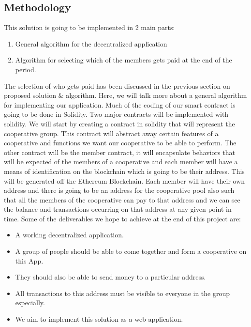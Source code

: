 \documentclass{article}
\begin{document}
\begin{flushleft}
\section{Methodology}
This solution is going to be implemented in 2 main parts:
\begin{enumerate}
    \item General algorithm for the decentralized application
    \item Algorithm for selecting which of the members gets paid at the end of the period.
\end{enumerate}

The selection of who gets paid has been discussed in the previous section on proposed solution \& algorithm. Here, we will talk more about a general algorithm for implementing our application. Much of the coding of our smart contract is going to be done in Solidity. Two major contracts will be implemented with solidity. We will start by creating a contract in solidity that will represent the cooperative group. This contract will abstract away certain features of a cooperative and functions we want our cooperative to be able to perform. The other contract will be the member contract, it will encapsulate behaviors that will be expected of the members of a cooperative and each member will have a means of identification on the blockchain which is going to be their address. This will be generated off the Ethereum Blockchain. Each member will have their own address and there is going to be an address for the cooperative pool also such that all the members of the cooperative can pay to that address and we can see the balance and transactions occurring on that address at any given point in time.
Some of the deliverables we hope to achieve at the end of this project are:
\begin{itemize}
    \item A working decentralized application.
    \item A group of people should be able to come together and form a cooperative on this App.
    \item They should also be able to send money to a particular address.
    \item All transactions to this address must be visible to everyone in the group especially.
    \item We aim to implement this solution as a web application.
\end{itemize}


\end{flushleft}
\end{document}
